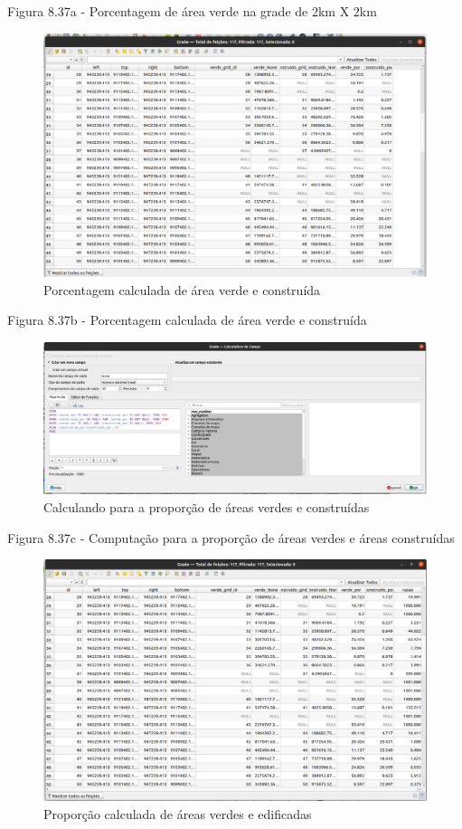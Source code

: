 \documentclass[
  portuguese,
]{krantz}
\begin{document}
Figura 8.37a - Porcentagem de área verde na grade de 2km X 2km

\begin{figure}
\centering
\includegraphics{media/modulo8/fig837_b.png}
\caption{Porcentagem calculada de área verde e construída}
\end{figure}

Figura 8.37b - Porcentagem calculada de área verde e construída

\begin{figure}
\centering
\includegraphics{media/modulo8/fig837_c.png}
\caption{Calculando para a proporção de áreas verdes e construídas}
\end{figure}

Figura 8.37c - Computação para a proporção de áreas verdes e áreas construídas

\begin{figure}
\centering
\includegraphics{media/modulo8/fig837_d.png}
\caption{Proporção calculada de áreas verdes e edificadas}
\end{figure}
\end{document}
